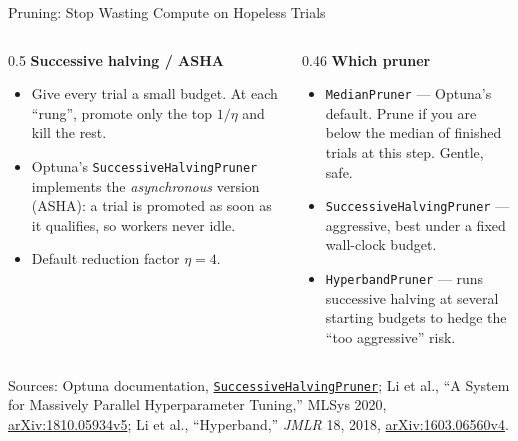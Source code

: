 \begin{frame}{Pruning: Stop Wasting Compute on Hopeless Trials}
    \vspace{0.05em}
    \begin{columns}[T]
        \begin{column}{0.5\textwidth}
            \scriptsize
            \textbf{Successive halving / ASHA}
            \begin{itemize}
                \item Give every trial a small budget. At each ``rung'', promote only the top
                      $1/\eta$ and kill the rest.
                \item Optuna's \texttt{SuccessiveHalvingPruner} implements the \emph{asynchronous} version
                      (ASHA): a trial is promoted as soon as it qualifies, so workers never idle.
                \item Default reduction factor $\eta = 4$.
            \end{itemize}
        \end{column}
        \begin{column}{0.46\textwidth}
            \scriptsize
            \textbf{Which pruner}
            \begin{itemize}
                \item \texttt{MedianPruner} --- Optuna's default. Prune if you are below the median of
                      finished trials at this step. Gentle, safe.
                \item \texttt{SuccessiveHalvingPruner} --- aggressive, best under a fixed wall-clock budget.
                \item \texttt{HyperbandPruner} --- runs successive halving at several starting budgets to
                      hedge the ``too aggressive'' risk.
            \end{itemize}
        \end{column}
    \end{columns}

    \vspace{0.04em}
    {\scriptsize Sources: Optuna documentation, \href{https://optuna.readthedocs.io/en/stable/reference/generated/optuna.pruners.SuccessiveHalvingPruner.html}{\texttt{SuccessiveHalvingPruner}};
    Li et al., ``A System for Massively Parallel Hyperparameter Tuning,'' MLSys 2020, \href{https://arxiv.org/abs/1810.05934v5}{arXiv:1810.05934v5};
    Li et al., ``Hyperband,'' \textit{JMLR} 18, 2018, \href{https://arxiv.org/abs/1603.06560v4}{arXiv:1603.06560v4}.}

\end{frame}
